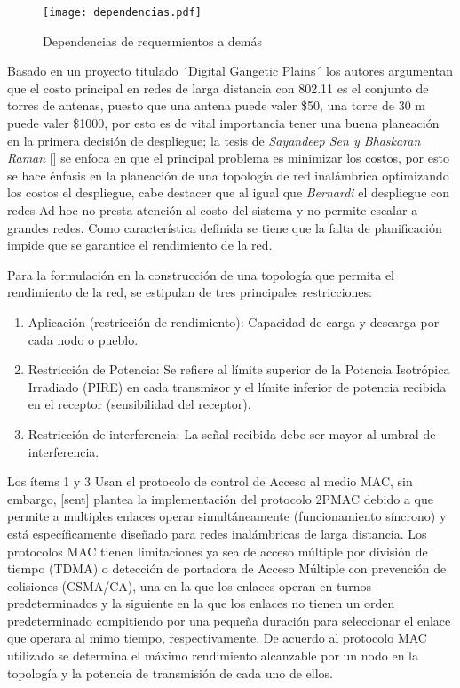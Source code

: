 \documentclass[]{article}
\providecommand{\tightlist}{%
  \setlength{\itemsep}{0pt}\setlength{\parskip}{0pt}}
\begin{document}
\begin{figure}
\centering
\texttt{[image: dependencias.pdf]}
\caption{Dependencias de requermientos a demás}
\end{figure}

Basado en un proyecto titulado ´Digital Gangetic Plains´ los autores
argumentan que el costo principal en redes de larga distancia con 802.11
es el conjunto de torres de antenas, puesto que una antena puede valer
\$50, una torre de 30 m puede valer \$1000, por esto es de vital
importancia tener una buena planeación en la primera decisión de
despliegue; la tesis de \emph{Sayandeep Sen y Bhaskaran Raman} {[}{]} se
enfoca en que el principal problema es minimizar los costos, por esto se
hace énfasis en la planeación de una topología de red inalámbrica
optimizando los costos el despliegue, cabe destacer que al igual que
\emph{Bernardi} el despliegue con redes Ad-hoc no presta atención al
costo del sistema y no permite escalar a grandes redes. Como
característica definida se tiene que la falta de planificación impide
que se garantice el rendimiento de la red.

Para la formulación en la construcción de una topología que permita el
rendimiento de la red, se estipulan de tres principales restricciones:

\begin{enumerate}
\def\labelenumi{\arabic{enumi}.}
\tightlist
\item
  Aplicación (restricción de rendimiento): Capacidad de carga y descarga
  por cada nodo o pueblo.
\item
  Restricción de Potencia: Se refiere al límite superior de la Potencia
  Isotrópica Irradiado (PIRE) en cada transmisor y el límite inferior de
  potencia recibida en el receptor (sensibilidad del receptor).
\item
  Restricción de interferencia: La señal recibida debe ser mayor al
  umbral de interferencia.
\end{enumerate}

Los ítems 1 y 3 Usan el protocolo de control de Acceso al medio MAC, sin
embargo, {[}sent{]} plantea la implementación del protocolo 2PMAC debido
a que permite a multiples enlaces operar simultáneamente (funcionamiento
síncrono) y está específicamente diseñado para redes inalámbricas de
larga distancia. Los protocolos MAC tienen limitaciones ya sea de acceso
múltiple por división de tiempo (TDMA) o detección de portadora de
Acceso Múltiple con prevención de colisiones (CSMA/CA), una en la que
los enlaces operan en turnos predeterminados y la siguiente en la que
los enlaces no tienen un orden predeterminado compitiendo por una
pequeña duración para seleccionar el enlace que operara al mimo tiempo,
respectivamente. De acuerdo al protocolo MAC utilizado se determina el
máximo rendimiento alcanzable por un nodo en la topología y la potencia
de transmisión de cada uno de ellos.
\end{document}
